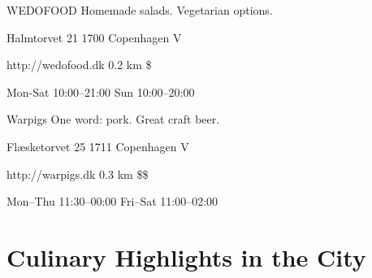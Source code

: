 \begin{fooditem}
{WEDOFOOD}
{Homemade salads. Vegetarian options.}
{\begin{addr}
{Halmtorvet 21}
{1700 Copenhagen V}
\end{addr}}
{http://wedofood.dk}
{0.2 km}
{\$}
{\begin{ohours}
{Mon-Sat}
{10:00–21:00}
{Sun}
{10:00–20:00}
{}
{}
{}
{}
\end{ohours}}
\end{fooditem}
\begin{fooditem}
{Warpigs}
{One word: pork. Great craft beer.}
{\begin{addr}
{Flæsketorvet 25}
{1711 Copenhagen V}
\end{addr}}
{http://warpigs.dk}
{0.3 km}
{\$\$}
{\begin{ohours}
{Mon–Thu}
{11:30–00:00}
{Fri–Sat}
{11:00–02:00}
{}
{}
{}
{}
\end{ohours}}
\end{fooditem}






\section{Culinary Highlights in the City}

